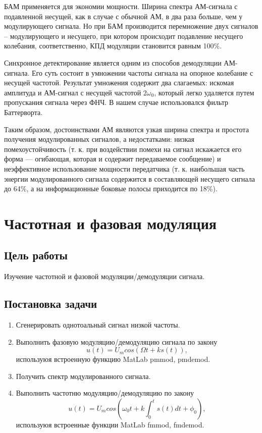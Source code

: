 \documentclass[10pt,a4paper]{article}
\begin{document}
БАМ применяется для экономии мощности. Ширина спектра АМ-сигнала с подавленной несущей, как  в случае с обычной АМ, в два раза больше, чем у модулирующего сигнала. Но при БАМ производится перемножение двух сигналов – модулирующего и несущего, при котором происходит подавление несущего колебания, соответственно, КПД модуляции становится равным 100\%. 

Синхронное детектирование является одним из способов демодуляции АМ-сигнала. Его суть состоит в умножении частоты сигнала на опорное колебание с несущей частотой. Результат умножения содержит два слагаемых: искомая амплитуда и АМ-сигнал с несущей частотой $2\omega_0$, который легко удаляется путем пропускания сигнала через ФНЧ. В нашем случае использовался фильтр Баттерворта.

Таким образом, достоинствами АМ являются узкая ширина спектра и простота получения модулированных сигналов, а недостатками:
низкая помехоустойчивость (т. к. при воздействии помехи на сигнал искажается его форма — огибающая, которая и содержит передаваемое сообщение) и неэффективное использование мощности передатчика (т. к. наибольшая часть энергии модулированного сигнала содержится в составляющей несущего сигнала до 64\%, а на информационные боковые полосы приходится по 18\%).


\newpage
\section{Частотная и фазовая модуляция}

\subsection{Цель работы}
Изучение частотной и фазовой модуляции/демодуляции сигнала.

\subsection{Постановка задачи}
	\begin{enumerate}
		\item Сгенерировать однотоальный сигнал низкой частоты.
		\item Выполнить фазовую модуляцию/демодуляцию сигнала по закону
				\begin{equation}
					u(t) = U_m cos(\Omega t + ks(t)),
				\end{equation}
		используюя встроенную функцию MatLab pmmod, pmdemod.
		\item Получить спектр модулированного сигнала.
		\item Выполнить частотню модуляцию/демодуляцию по закону
				\begin{equation}
					u(t) = U_m cos(\omega_0 t + k \int_0^t s(t) dt + \phi_0),
				\end{equation}
		используюя встроенные функции MatLab fmmod, fmdemod.
	\end{enumerate}
\end{document}
